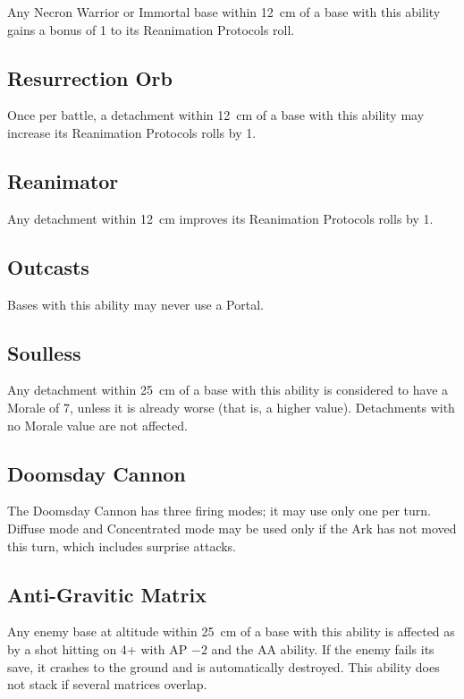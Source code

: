 Any Necron Warrior or Immortal base within 12~cm of a base with this ability gains a bonus of 1 to its Reanimation Protocols roll.

\subsection{Resurrection Orb}

Once per battle, a detachment within 12~cm of a base with this ability may increase its Reanimation Protocols rolls by 1.

\subsection{Reanimator}

Any detachment within 12~cm improves its Reanimation Protocols rolls by 1.

\subsection{Outcasts}

Bases with this ability may never use a Portal.

\subsection{Soulless}

Any detachment within 25~cm of a base with this ability is considered to have a Morale of 7, unless it is already worse (that is, a higher value). Detachments with no Morale value are not affected.

\subsection{Doomsday Cannon}

The Doomsday Cannon has three firing modes; it may use only one per turn. Diffuse mode and Concentrated mode may be used only if the Ark has not moved this turn, which includes surprise attacks.

\subsection{Anti-Gravitic Matrix}

Any enemy base at altitude within 25~cm of a base with this ability is affected as by a shot hitting on 4+ with AP $-2$ and the AA ability. If the enemy fails its save, it crashes to the ground and is automatically destroyed. This ability does not stack if several matrices overlap.

